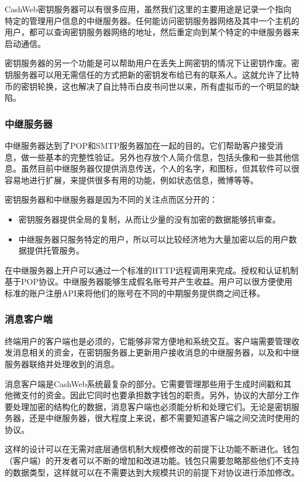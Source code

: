 \documentclass{article}
\begin{document}
CashWeb密钥服务器可以有很多应用，虽然我们这里的主要用途是记录一个指向特定的管理用户信息的中继服务器。任何能访问密钥服务器网络及其中一个主机的用户，都可以查询密钥服务器网络的地址，然后重定向到某个特定的中继服务器来启动通信。

密钥服务器的另一个功能是可以帮助用户在丢失上网密钥的情况下让密钥作废。密钥服务器可以用无需信任的方式把新的密钥发布给已有的联系人。这就允许了比特币的密钥轮换，这也解决了自比特币白皮书问世以来，所有虚拟币的一个明显的缺陷。

\subsubsection{中继服务器}

中继服务器达到了POP和SMTP服务器加在一起的目的。它们帮助客户接受消息，做一些基本的完整性验证。另外也存放个人简介信息，包括头像和一些其他信息。虽然目前中继服务器仅提供消息传送，个人的名字，和图标，但其软件可以很容易地进行扩展，来提供很多有用的功能，例如状态信息，微博等等。

密钥服务器和中继服务器是因为不同的关注点而区分开的：
\begin{itemize}
  \item 密钥服务器提供全局的复制，从而让少量的没有加密的数据能够抗审查。
  \item 中继服务器只服务特定的用户，所以可以比较经济地为大量加密以后的用户数据提供托管服务。
\end{itemize}

在中继服务器上开户可以通过一个标准的HTTP远程调用来完成。授权和认证机制基于POP协议。中继服务器能够生成假名账号并产生收益。用户可以很方便使用标准的账户注册API来将他们的账号在不同的中期服务提供商之间迁移。

\subsubsection{消息客户端}

终端用户的客户端也是必须的，它能够非常方便地和系统交互。客户端需要管理收发消息相关的资金，在密钥服务器上更新用户接收消息的中继服务器，以及和中继服务器联络并处理收到的消息。

消息客户端是CashWeb系统最复杂的部分。它需要管理那些用于生成时间戳和其他微支付的资金。因此它同时也要承担数字钱包的职责。另外，协议的大部分工作要处理加密的结构化的数据，消息客户端也必须能分析和处理它们。无论是密钥服务器，还是中继服务器，很大程度上来说，都不需要知道客户端之间交流时使用的协议。

这样的设计可以在无需对底层通信机制大规模修改的前提下让功能不断进化。钱包（客户端）的开发者可以不断的增加和改进功能。钱包只需要忽略那些他们不支持的数据类型，这样就可以在不需要达到大规模共识的前提下对协议进行添加修改。
\end{document}
